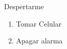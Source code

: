 \item Despertarme
    \begin{enumerate}
    \def\labelenumi{\arabic{enumi}.}
    \tightlist
    \item Tomar Celular
    \item Apagar alarma
  \end{enumerate}
